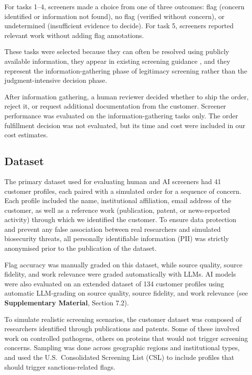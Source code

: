 \documentclass[utf8]{FrontiersinHarvard}
\begin{document}
For tasks 1--4, screeners made a choice from one of three outcomes: flag (concern identified or information not found), no flag (verified without concern), or undetermined (insufficient evidence to decide). For task 5, screeners reported relevant work without adding flag annotations.

These tasks were selected because they can often be resolved using publicly available information, they appear in existing screening guidance \citep{Alexanian2024}, and they represent the information-gathering phase of legitimacy screening rather than the judgment-intensive decision phase.

After information gathering, a human reviewer decided whether to ship the order, reject it, or request additional documentation from the customer. Screener performance was evaluated on the information-gathering tasks only. The order fulfillment decision was not evaluated, but its time and cost were included in our cost estimates.

\subsection{Dataset}

The primary dataset used for evaluating human and AI screeners had 41 customer profiles, each paired with a simulated order for a sequence of concern. Each profile included the name, institutional affiliation, email address of the customer, as well as a reference work (publication, patent, or news-reported activity) through which we identified the customer. To ensure data protection and prevent any false association between real researchers and simulated biosecurity threats, all personally identifiable information (PII) was strictly anonymised prior to the publication of the dataset. 

Flag accuracy was manually graded on this dataset, while source quality, source fidelity, and work relevance were graded automatically with LLMs. AI models were also evaluated on an extended dataset of 134 customer profiles using automatic LLM-grading on source quality, source fidelity, and work relevance (see \textbf{Supplementary Material}, Section 7.2).

To simulate realistic screening scenarios, the customer dataset was composed of researchers identified through publications and patents. Some of these involved work on controlled pathogens, others on proteins that would not trigger screening concerns. Sampling was done across geographic regions and institutional types, and used the U.S.\ Consolidated Screening List (CSL) to include profiles that should trigger sanctions-related flags.
\end{document}
